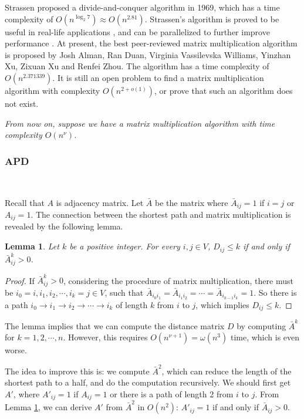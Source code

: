 \documentclass[11pt]{article}
\theoremstyle{plain}
\newtheorem{lemma}{Lemma}[section]
\begin{document}
Strassen proposed a divide-and-conquer algorithm in 1969, which has a time complexity of $O(n^{\log_2 7})\approx O(n^{2.81})$. Strassen's algorithm is proved to be useful in real-life applications \cite{cite-key}, and can be parallelized to further improve performance \cite{CHOU199549}. At present, the best peer-reviewed matrix multiplication algorithm is proposed by Josh Alman, Ran Duan, Virginia Vassilevska Williams, Yinzhan Xu, Zixuan Xu and Renfei Zhou. The algorithm has a time complexity of $O(n^{2.371339})$\cite{alman2024more}. It is still an open problem to find a matrix multiplication algorithm with complexity $O(n^{2+o(1)})$, or prove that such an algorithm does not exist.

\emph{From now on, suppose we have a matrix multiplication algorithm with time complexity $O(n^\nu)$.}

\subsubsection{APD}\

Recall that $A$ is adjacency matrix. Let $\bar{A}$ be the matrix where $\bar{A}_{ij}=1$ if $i=j$ or $A_{ij}=1$. The connection between the shortest path and matrix multiplication is revealed by the following lemma.
\begin{lemma}
    \label{lemma:shortest_path_matrix_multiplication}
    Let $k$ be a positive integer. For every $i,j\in V$, $D_{ij}\le k$ if and only if $\bar{A}^k_{ij}>0$.
\end{lemma}
\begin{proof}
If $\bar{A}^k_{ij}>0$, considering the procedure of matrix multiplication, there must be $i_0=i,i_1,i_2,\cdots,i_k=j\in V$, such that $\bar A_{i_0i_1}=\bar A_{i_1i_2}=\cdots=\bar A_{i_{k-1}i_k}=1$. So there is a path $i_0\to i_1\to i_2\to\cdots\to i_k$ of length $k$ from $i$ to $j$, which implies $D_{ij}\le k$.
\end{proof}

The lemma implies that we can compute the distance matrix $D$ by computing $\bar{A}^k$ for $k=1,2,\cdots,n$. However, this requires $O(n^{\nu+1})=\omega(n^3)$ time, which is even worse.

The idea to improve this is: we compute $\bar A^2$, which can reduce the length of the shortest path to a half, and do the computation recursively. We should first get $A'$, where $A'_{ij}=1$ if $A_{ij}=1$ or there is a path of length 2 from $i$ to $j$. From Lemma \ref{lemma:shortest_path_matrix_multiplication}, we can derive $A'$ from $\bar A^2$ in $O(n^2)$: $A'_{ij}=1$ if and only if $\bar A_{ij}>0$.
\end{document}
